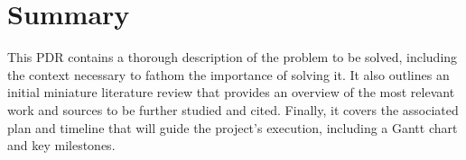 \chapter{Summary}
This \acf{PDR} contains a thorough description of the problem to be solved, including the context necessary to fathom the importance of solving it.
It also outlines an initial miniature literature review that provides an overview of the most relevant work and sources to be further studied and cited.
Finally, it covers the associated plan and timeline that will guide the project's execution, including a Gantt chart and key milestones.
